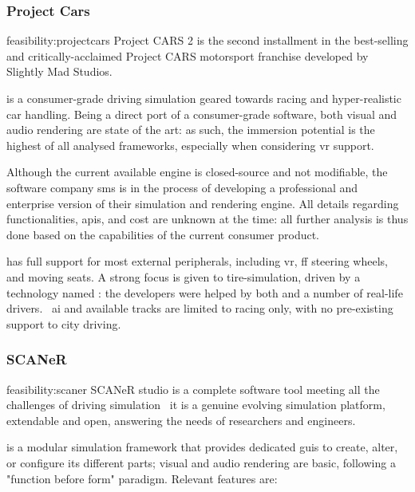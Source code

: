 \subsubsection{Project Cars}

\begin{excerpt}{feasibility:projectcars}
    Project CARS 2 is the second installment in the best-selling and critically-acclaimed Project CARS motorsport franchise developed by Slightly Mad Studios.
\end{excerpt}

 is a consumer-grade driving simulation geared towards racing and hyper-realistic car handling. Being a direct port of a consumer-grade software, both visual and audio rendering are state of the art: as such, the immersion potential is the highest of all analysed \glspl{framework}, especially when considering \gls{vr} support.

Although the current available engine is closed-source and not modifiable, the software company \gls{sms} is in the process of developing a professional and enterprise version of their simulation and rendering engine. All details regarding functionalities, \glspl{api}, and cost are unknown at the time: all further analysis is thus done based on the capabilities of the current consumer product.

 has full support for most external peripherals, including \gls{vr}, \gls{ff} steering wheels, and moving seats. A strong focus is given to tire-simulation, driven by a technology named : the developers were helped by both  and a number of real-life drivers.~\cite{feasibility:projectcarstires} \gls{ai} and available tracks are limited to racing only, with no pre-existing support to city driving.

\subsubsection{SCANeR}

\begin{excerpt}{feasibility:scaner}
SCANeR studio is a complete software tool meeting all the challenges of driving simulation \CHARomissis\ it is a genuine evolving simulation platform, extendable and open, answering the needs of researchers and engineers.
\end{excerpt}

 is a modular simulation \gls{framework} that provides dedicated \glspl{gui} to create, alter, or configure its different parts; visual and audio rendering are basic, following a "function before form" paradigm. Relevant \glspl{feature} are:

